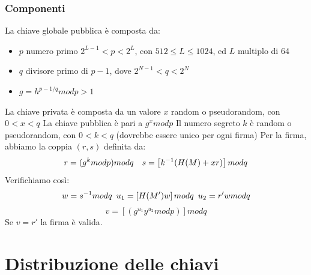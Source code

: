 \documentclass[11pt]{article}
\begin{document}
\subsubsection{Componenti}
La chiave globale pubblica è composta da:
\begin{itemize}
    \item $p$ numero primo $2^{L-1} < p < 2^L$, con $512 \le L \le 1024$, ed $L$ multiplo di 64
    \item $q$ divisore primo di $p-1$, dove $2^{N-1} < q < 2^N$
    \item $g=h^{p-1/q} mod p > 1$ 
\end{itemize}
La chiave privata è composta da un valore $x$ random o pseudorandom, con $0 < x < q$
La chiave pubblica è pari a $g^x mod p$
Il numero segreto $k$ è random o pseudorandom, con $0<k<q$ (dovrebbe essere unico per ogni firma)
Per la firma, abbiamo la coppia $(r,s)$ definita da:
\begin{displaymath}
    r = (g^k mod p) mod q \hspace{10px}s = \left[k^{-1}(H(M) + xr) \right] mod q
\end{displaymath}
Verifichiamo così:
\begin{displaymath}
    w = s^{-1} mod q \hspace{5px} u_1= \left[H(M')w\right] mod q \hspace{5px}u_2 = r'w mod q
\end{displaymath}
\begin{displaymath}
    v= \left[(g^{u_1}y^{u_2} mod p)\right] mod q
\end{displaymath}
Se $v=r'$ la firma è valida.

\section{Distribuzione delle chiavi}
\end{document}
